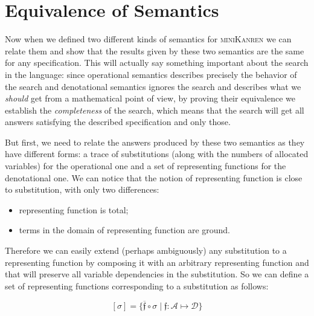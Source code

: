\section{Equivalence of Semantics}
\label{equivalence}

Now when we defined two different kinds of semantics for \textsc{miniKanren} we can relate them and show that the results given by these two semantics are the same for any specification.
This will actually say something important about the search in the language: since operational semantics describes precisely the behavior of the search and denotational semantics
ignores the search and describes what we \emph{should} get from a mathematical point of view, by proving their equivalence we establish the \emph{completeness} of the search, which
means that the search will get all answers satisfying the described specification and only those.

But first, we need to relate the answers produced by these two semantics as they have different forms: a trace of substitutions (along with the numbers of allocated variables)
for the operational one and a set of representing functions for the denotational one. We can notice that the notion of representing function is close to substitution, with only two differences:

\begin{itemize}
\item representing function is total;
\item terms in the domain of representing function are ground.
\end{itemize}

Therefore we can easily extend (perhaps ambiguously) any substitution to a representing function by composing it with an arbitrary representing function and that will
preserve all variable dependencies in the substitution. So we can define a set of representing functions corresponding to a substitution as follows:

\[
[\sigma] = \{\overline{\mathfrak f} \circ \sigma \mid \mathfrak{f}:\mathcal{A}\mapsto\mathcal{D}\}
\]

\begin{comment}
In \textsc{Coq} this notion boils down to the following definition:

\begin{lstlisting}[language=Coq]
   Definition in_denotational_sem_subst
     (s : subst) (f : repr_fun) : Prop :=
       exists (f' : repr_fun),
         repr_fun_eq (subst_repr_fun_compose s f') f.
\end{lstlisting}

where ``\lstinline[language=Coq]|repr_fun_eq|'' stands for representing functions extensional equality, ``\lstinline[language=Coq]|subst_repr_fun_compose|''~---
for a composition of a substitution and a representing function.
\end{comment}

